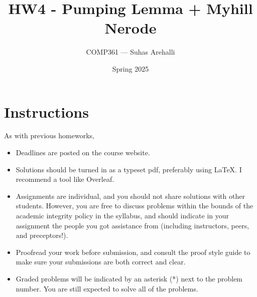 \documentclass{exam}
\title{HW4 - Pumping Lemma + Myhill Nerode}
\author{COMP361 --- Suhas Arehalli}
\date{Spring 2025}
\theoremstyle{definition}
\begin{document}
\maketitle

\section*{Instructions}
As with previous homeworks, 

\begin{itemize}
    \item Deadlines are posted on the course website.
    \item Solutions should be turned in as a typeset pdf, preferably using LaTeX. I recommend a tool like Overleaf. 
    \item Assignments are individual, and you should not share solutions with other students. However, you are free to discuss problems within the bounds of the academic integrity policy in the syllabus, and should indicate in your assignment the people you got assistance from (including instructors, peers, and preceptors!). 
    \item Proofread your work before submission, and consult the proof style guide to make sure your submissions are both correct and clear.
    \item Graded problems will be indicated by an asterisk (*) next to the problem number. You are still expected to solve all of the problems.
\end{itemize}
\end{document}
